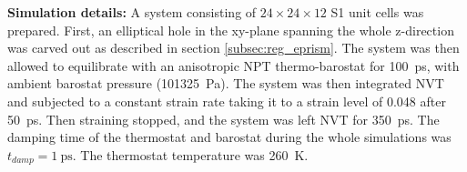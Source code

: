 \begin{framed} 
\textbf{Simulation details:} A system consisting of $24 \times 24\times 12$ S1 unit cells was prepared. First, an elliptical hole in the xy-plane spanning the whole z-direction was carved out as described in section \ref{subsec:reg_eprism}. The system was then allowed to equilibrate with an anisotropic NPT thermo-barostat for \SI{100}{\pico\second}, with ambient barostat pressure (\SI{101325}{\pascal}). The system was then integrated NVT and subjected to a constant strain rate taking it to a strain level of 0.048 after \SI{50}{\pico\second}. Then straining stopped, and the system was left NVT for \SI{350}{\pico\second}. The damping time of the thermostat and barostat during the whole simulations was $t_{damp} = \SI{1}{\ps}$. The thermostat temperature was \SI{260}{\kelvin}.
\end{framed}


